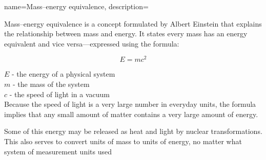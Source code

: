 {
    name=Mass–energy equivalence,
    description={Mass–energy equivalence is a concept formulated by Albert Einstein that explains the relationship between mass and energy. It states every mass has an energy equivalent and vice versa—expressed using the formula:

$$E = mc^2$$

$E$ - the energy of a physical system \\
$m$ - the mass of the system\\
$c$ - the speed of light in a vacuum\\

Because the speed of light is a very large number in everyday units, the formula implies that any small amount of matter contains a very large amount of energy.

Some of this energy may be released as heat and light by nuclear transformations. This also serves to convert units of mass to units of energy, no matter what system of measurement units used}
}
